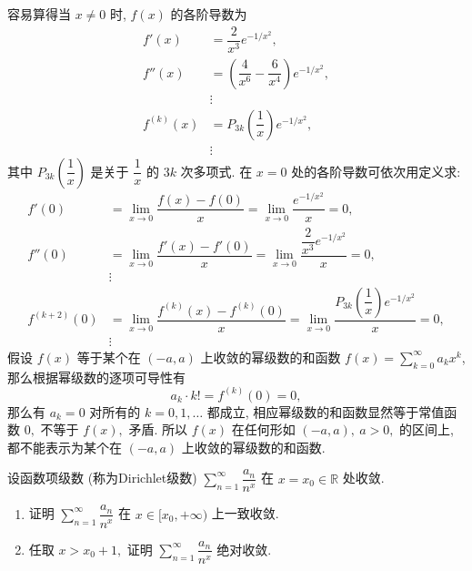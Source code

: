 \begin{solution}
容易算得当 $x \neq 0$ 时, $f(x)$ 的各阶导数为
\begin{align*}
f'(x) & = \dfrac{2}{x^3} e^{-1/x^2}, \\
f''(x) & = \left( \dfrac{4}{x^6} - \dfrac{6}{x^4} \right) e^{-1/x^2}, \\
& \vdots \\
f^{(k)}(x) & = P_{3k} \left( \dfrac{1}{x} \right) e^{-1/x^2}, \\
& \vdots
\end{align*}
其中 $P_{3k} \left( \dfrac{1}{x} \right)$ 是关于 $\dfrac{1}{x}$ 的 $3k$ 次多项式. 在 $x = 0$ 处的各阶导数可依次用定义求:
\begin{align*}
f'(0) & = \lim\limits_{x \to 0} \dfrac{f(x) - f(0)}{x} = \lim\limits_{x \to 0} \dfrac{e^{-1/x^2}}{x} = 0, \\
f''(0) & = \lim\limits_{x \to 0} \dfrac{f'(x) - f'(0)}{x} = \lim\limits_{x \to 0} \dfrac{\dfrac{2}{x^3} e^{-1/x^2}}{x} = 0, \\
& \vdots \\
f^{(k+2)}(0) & = \lim\limits_{x \to 0} \dfrac{f^{(k)}(x) - f^{(k)}(0)}{x} = \lim\limits_{x \to 0} \dfrac{P_{3k} \left( \dfrac{1}{x} \right) e^{-1/x^2}}{x} = 0, \\
& \vdots
\end{align*}
假设 $f(x)$ 等于某个在 $(-a, a)$ 上收敛的幂级数的和函数 $f(x) = \sum\limits_{k=0}^\infty a_k x^k$, 那么根据幂级数的逐项可导性有
\[a_k \cdot k! = f^{(k)}(0) = 0,\]
那么有 $a_k = 0$ 对所有的 $k = 0, 1, \dots$ 都成立, 相应幂级数的和函数显然等于常值函数 $0,$ 不等于 $f(x),$ 矛盾. 所以 $f(x)$ 在任何形如 $(-a, a), ~ a > 0,$ 的区间上, 都不能表示为某个在 $(-a, a)$ 上收敛的幂级数的和函数.
\end{solution}

\begin{question}[points = 10]
设函数项级数 (称为Dirichlet级数) $\sum\limits_{n=1}^\infty \dfrac{a_n}{n^x}$ 在 $x = x_0 \in \mathbb{R}$ 处收敛.

\begin{enumerate}
\item 证明 $\sum\limits_{n=1}^\infty \dfrac{a_n}{n^x}$ 在 $x \in [x_0, +\infty)$ 上一致收敛.
\item 任取 $x > x_0 + 1,$ 证明 $\sum\limits_{n=1}^\infty \dfrac{a_n}{n^x}$ 绝对收敛.
\end{enumerate}

\end{question}

